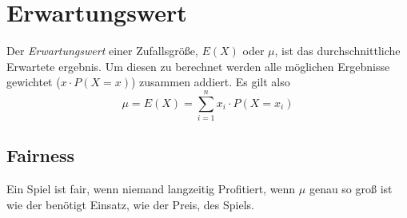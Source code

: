 \documentclass{article}
\begin{document}
\section{Erwartungswert}
Der \emph{Erwartungswert} einer Zufallsgröße, $E(X)$ oder $\mu$, ist das durchschnittliche Erwartete ergebnis. Um diesen zu berechnet werden alle möglichen Ergebnisse gewichtet ($x \cdot P(X=x)$) zusammen addiert. Es gilt also
\[
 \mu = E(X) = \sum_{i=1}^n x_i \cdot P(X=x_i) 
\] 
 
\subsection{Fairness}
Ein Spiel ist fair, wenn niemand langzeitig Profitiert, wenn $\mu$ genau so groß ist wie der benötigt Einsatz, wie der Preis, des Spiels.
\end{document}
